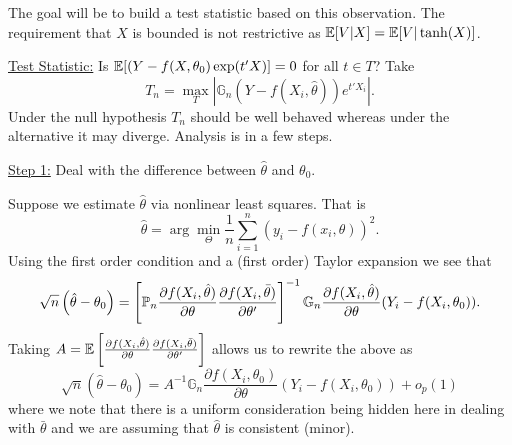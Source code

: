 \begin{example*}
	The goal will be to build a test statistic based on this observation. The requirement that \(X\) is bounded is not restrictive as \(\E[V|X] = \E[V|\tanh(X)]\).  

	\underline{Test Statistic:} Is \(\E[(Y-f(X,\theta_0)\exp(t'X)]=0\) for all \(t \in T\)? Take 
	\[
		T_n = \max_T \left|\mathbb{G}_n(Y-f(X_i,\hat\theta))e^{t'X_i}\right|
	.\]
	Under the null hypothesis \(T_n\) should be well behaved whereas under the alternative it may diverge. Analysis is in a few steps. 
	
	\underline{Step 1:} Deal with the difference between \(\hat\theta\) and \(\theta_0\). 

	Suppose we estimate \(\hat\theta\) via nonlinear least squares. That is 
	\[
		\hat\theta = \arg\min_\Theta \frac{1}{n}\sum_{i=1}^n \left(y_i - f(x_i,\theta)\right)^2
	.\] 
	Using the first order condition and a (first order) Taylor expansion we see that 
	\[
		\sqrt{n}\left(\hat\theta-\theta_0\right) = \left[\P_n\frac{\partial f(X_i,\hat\theta)}{\partial \theta}\frac{\partial f(X_i,\bar\theta)}{\partial \theta'}\right]^{-1}\mathbb{G}_n \frac{\partial f(X_i,\hat\theta)}{\partial \theta}(Y_i-f(X_i,\theta_0))
	.\]
	Taking \(A =  \E\left[\frac{\partial f(X_i,\hat\theta)}{\partial \theta}\frac{\partial f(X_i,\bar\theta)}{\partial \theta'}\right]\) allows us to rewrite the above as 
	\begin{equation}
		\label{eq:specification-taylor}
		\sqrt{n}(\hat\theta-\theta_0) = A^{-1}\mathbb{G}_n \frac{\partial f(X_i,\theta_0)}{\partial \theta}(Y_i-f(X_i,\theta_0)) + o_p(1)\tag{S1}
	\end{equation}
	where we note that there is a uniform consideration being hidden here in dealing with \(\bar\theta\) and we are assuming that \(\hat\theta\) is consistent (minor).


\end{example*}
